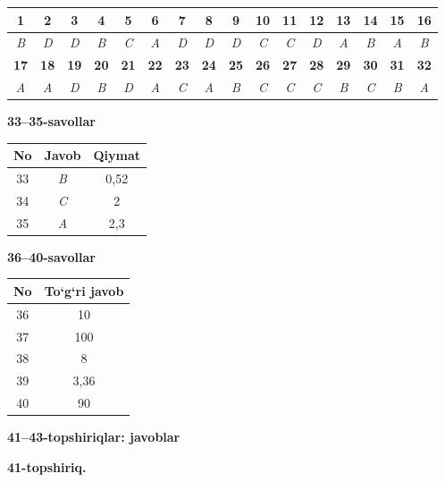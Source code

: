 \documentclass[11pt,a4paper]{article}
\begin{document}
\noindent\begin{tabular}{|c|c|c|c|c|c|c|c|c|c|c|c|c|c|c|c|}\hline
\textbf{1} & \textbf{2} & \textbf{3} & \textbf{4} & \textbf{5} & \textbf{6} & \textbf{7} & \textbf{8} & \textbf{9} & \textbf{10} & \textbf{11} & \textbf{12} & \textbf{13} & \textbf{14} & \textbf{15} & \textbf{16}\\\hline
\textsl{B} & \textsl{D} & \textsl{D} & \textsl{B} & \textsl{C} & \textsl{A} & \textsl{D} & \textsl{D} & \textsl{D} & \textsl{C} & \textsl{C} & \textsl{D} & \textsl{A} & \textsl{B} & \textsl{A} & \textsl{B}\\\hline
\textbf{17} & \textbf{18} & \textbf{19} & \textbf{20} & \textbf{21} & \textbf{22} & \textbf{23} & \textbf{24} & \textbf{25} & \textbf{26} & \textbf{27} & \textbf{28} & \textbf{29} & \textbf{30} & \textbf{31} & \textbf{32}\\\hline
\textsl{A} & \textsl{A} & \textsl{D} & \textsl{B} & \textsl{D} & \textsl{A} & \textsl{C} & \textsl{A} & \textsl{B} & \textsl{C} & \textsl{C} & \textsl{C} & \textsl{B} & \textsl{C} & \textsl{B} & \textsl{A}\\\hline
\end{tabular}\par\medskip
\noindent\textbf{33--35-savollar}\par\smallskip
\noindent\begin{tabular}{|c|c|c|}\hline \textbf{No} & \textbf{Javob} & \textbf{Qiymat}\\\hline
33 & \textsl{B} & 0,52\\\hline
34 & \textsl{C} & 2\\\hline
35 & \textsl{A} & 2,3\\\hline
\end{tabular}\par\medskip
\noindent\textbf{36--40-savollar}\par\smallskip
\noindent\begin{tabular}{|c|c|}\hline \textbf{No} & \textbf{To`g`ri javob}\\\hline
36 & 10\\\hline
37 & 100\\\hline
38 & 8\\\hline
39 & 3,36\\\hline
40 & 90\\\hline
\end{tabular}\par\medskip
\noindent\textbf{41--43-topshiriqlar: javoblar}\par\smallskip
\noindent\textbf{41-topshiriq.}\par
\end{document}
